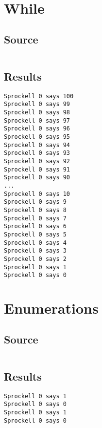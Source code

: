 \documentclass[twoside]{report}
\begin{document}
\section{While}
\subsection{Source}
\inputminted[tabsize=4,linenos,firstnumber=1]{text}{../../src/haskell/PP-project-2017/test/while.shl}
\subsection{Results}
\begin{verbatim}
Sprockell 0 says 100
Sprockell 0 says 99
Sprockell 0 says 98
Sprockell 0 says 97
Sprockell 0 says 96
Sprockell 0 says 95
Sprockell 0 says 94
Sprockell 0 says 93
Sprockell 0 says 92
Sprockell 0 says 91
Sprockell 0 says 90
...
Sprockell 0 says 10
Sprockell 0 says 9
Sprockell 0 says 8
Sprockell 0 says 7
Sprockell 0 says 6
Sprockell 0 says 5
Sprockell 0 says 4
Sprockell 0 says 3
Sprockell 0 says 2
Sprockell 0 says 1
Sprockell 0 says 0
\end{verbatim}

\section{Enumerations}
\subsection{Source}
\inputminted[tabsize=4,linenos,firstnumber=1]{text}{../../src/haskell/PP-project-2017/test/enum.shl}
\subsection{Results}
\begin{verbatim}
Sprockell 0 says 1
Sprockell 0 says 0
Sprockell 0 says 1
Sprockell 0 says 0
\end{verbatim}
\end{document}
